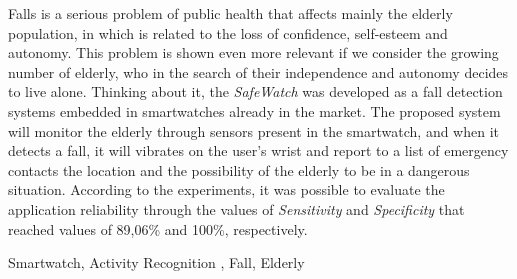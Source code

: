 Falls is a serious problem of public health that affects mainly the elderly population, in which is related to the loss of confidence, self-esteem and autonomy. This problem is shown even more relevant if we consider the growing number of elderly, who in the search of their independence and autonomy decides to live alone. Thinking about it, the \textit{SafeWatch} was developed as a fall detection systems embedded in smartwatches already in the market. The proposed system will monitor the elderly through sensors present in the smartwatch, and when it detects a fall, it will  vibrates on the user's wrist and report to a list of emergency contacts the location and the possibility of the elderly to be in a dangerous situation. According to the experiments, it was possible to evaluate the application reliability through the values of \textit{Sensitivity} and \textit{Specificity} that reached values of 89,06\% and 100\%, respectively. 

\begin{keywords}
	Smartwatch, Activity Recognition , Fall, Elderly
\end{keywords}